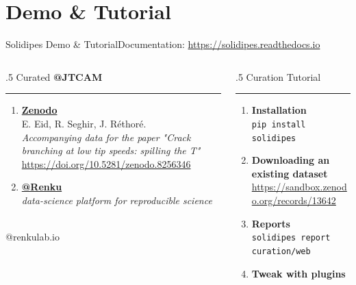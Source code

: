 \documentclass[10pt,compress,serif,aspectratio=169]{beamer}
\begin{document}

\section{Demo \& Tutorial}
\begin{frame}[c]{Solidipes Demo \& Tutorial}{Documentation: \href{https://solidipes.readthedocs.io/en/latest/}{https://solidipes.readthedocs.io}}
	\vspace{1em}
	\begin{columns}
		\begin{column}{.5\textwidth}
			Curated \textbf{@JTCAM}
			\hrule
			\vspace{.2cm}
			\begin{enumerate}
				\item \textbf{\href{https://doi.org/10.5281/zenodo.8256346}{Zenodo}}\\
				      {\footnotesize E. Eid, R. Seghir, J. Réthoré. \\\textit{Accompanying data for the paper "Crack branching at low tip speeds: spilling the T"}}\\
				      {\footnotesize \url{https://doi.org/10.5281/zenodo.8256346}}
				\item \textbf{\href{https://renkulab.io/p/guillaume.anciaux/doi-org-10-5281-zenodo-8256346/sessions/01M1XNZTC960B5T680GXDW82M8/start}{@Renku}}\\ \textit{data-science platform for reproducible science }
			\end{enumerate}
			\vfill
			\vspace{.2cm}
			\begin{center}
				\\@renkulab.io
			\end{center}
			\vspace{.8cm}
			\vfill
		\end{column}
		\pause
		\begin{column}{.5\textwidth}
			Curation Tutorial
			\vspace{.1cm}
			\hrule
			\begin{enumerate}
				\setlength{\itemsep}{1em}
				\item \textbf{Installation} \\ \texttt{\small pip install solidipes}
				\item \textbf{Downloading an existing dataset} \\ \small \href{https://sandbox.zenodo.org/records/13642}{https://sandbox.zenodo.org/records/13642}
				\item \textbf{Reports} \\ \texttt{\small solidipes report curation/web}
				\item \textbf{Tweak with plugins}
			\end{enumerate}
			\vspace{.2cm}


\end{column}
\end{columns}
\end{frame}
\end{document}
